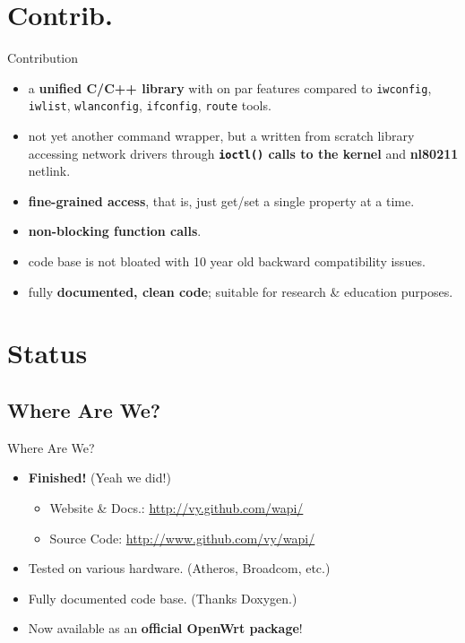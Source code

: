 \documentclass[turkish,12pt,red,compress,mathserif]{beamer}
\begin{document}
\section{Contrib.}

\begin{frame}{Contribution}
  \begin{itemize}
  \item a \textbf{unified C/C++ library} with on par features compared to
    \texttt{iwconfig}, \texttt{iwlist}, \texttt{wlanconfig}, \texttt{ifconfig},
    \texttt{route} tools.
  \item not yet another command wrapper, but a written from scratch library
    accessing network drivers through \textbf{\texttt{ioctl()} calls to the
      kernel} and \textbf{nl80211} netlink.
  \item \textbf{fine-grained access}, that is, just get/set a single property at
    a time.
  \item \textbf{non-blocking function calls}.
  \item code base is not bloated with 10 year old backward compatibility issues.
  \item fully \textbf{documented, clean code}; suitable for research \&
    education purposes.
  \end{itemize}
\end{frame}


\section{Status}

\subsection{Where Are We?}

\begin{frame}{Where Are We?}
  \begin{itemize}
  \item \textbf{Finished!} (Yeah we did!)
    \begin{itemize}
    \item Website \& Docs.: \url{http://vy.github.com/wapi/}
    \item Source Code: \url{http://www.github.com/vy/wapi/}
    \end{itemize}
  \item Tested on various hardware. (Atheros, Broadcom, etc.)
  \item Fully documented code base. (Thanks Doxygen.)
  \item Now available as an \textbf{official OpenWrt package}!
  \end{itemize}
\end{frame}
\end{document}
